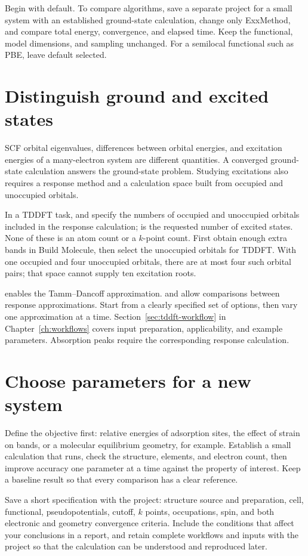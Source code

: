 Begin with default. To compare algorithms, save a separate project for a small system with an established ground-state calculation, change only ExxMethod, and compare total energy, convergence, and elapsed time. Keep the functional, model dimensions, and sampling unchanged. For a semilocal functional such as PBE, leave default selected.

\section{Distinguish ground and excited states}

SCF orbital eigenvalues, differences between orbital energies, and excitation energies of a many-electron system are different quantities. A converged ground-state calculation answers the ground-state problem. Studying excitations also requires a response method and a calculation space built from occupied and unoccupied orbitals.

In a TDDFT task,  and  specify the numbers of occupied and unoccupied orbitals included in the response calculation;  is the requested number of excited states. None of these is an atom count or a $k$-point count. First obtain enough extra bands in Build Molecule, then select the unoccupied orbitals for TDDFT. With one occupied and four unoccupied orbitals, there are at most four such orbital pairs; that space cannot supply ten excitation roots.

 enables the Tamm--Dancoff approximation.  and  allow comparisons between response approximations. Start from a clearly specified set of options, then vary one approximation at a time. Section~\ref{sec:tddft-workflow} in Chapter~\ref{ch:workflows} covers input preparation, applicability, and example parameters. Absorption peaks require the corresponding response calculation.

\section{Choose parameters for a new system}

Define the objective first: relative energies of adsorption sites, the effect of strain on bands, or a molecular equilibrium geometry, for example. Establish a small calculation that runs, check the structure, elements, and electron count, then improve accuracy one parameter at a time against the property of interest. Keep a baseline result so that every comparison has a clear reference.

Save a short specification with the project: structure source and preparation, cell, functional, pseudopotentials, cutoff, $k$ points, occupations, spin, and both electronic and geometry convergence criteria. Include the conditions that affect your conclusions in a report, and retain complete workflows and inputs with the project so that the calculation can be understood and reproduced later.
